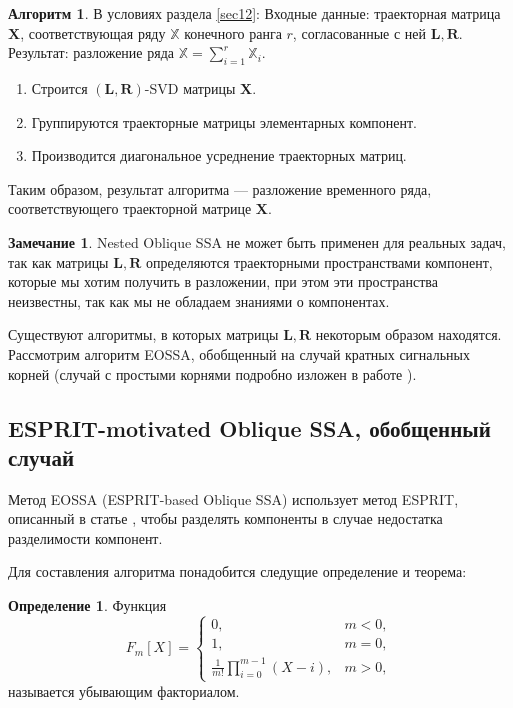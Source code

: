 \documentclass[specialist, substylefile = spbureport.rtx, subf,href,colorlinks=true, 12pt]{disser}
\theoremstyle{definition}
\newtheorem{definition}{Определение}
\newtheorem{algorithm}{Алгоритм}
\newtheorem{remark}{Замечание}
\begin{document}
\begin{algorithm}
    В условиях раздела \ref{sec12}:
    Входные данные: траекторная матрица $\mathbf{X}$, соответствующая ряду $\mathbb{X}$ конечного ранга $r$, согласованные с ней $\mathbf{L}, \mathbf{R}$.\\
    Результат: разложение ряда $\mathbb{X} = \sum_{i = 1}^{r}\mathbb{X}_i$.
\end{algorithm}
    \begin{enumerate}
        \item Строится $(\mathbf{L}, \mathbf{R})$-SVD матрицы $\mathbf{X}$.
        \item Группируются траекторные матрицы элементарных компонент.
        \item Производится диагональное усреднение траекторных матриц.
    \end{enumerate}
    Таким образом, результат алгоритма --- разложение временного ряда, соответствующего траекторной матрице $\mathbf{X}$.
    \begin{remark}
    Nested Oblique SSA не может быть применен для реальных задач, так как матрицы $\mathbf{L}, \mathbf{R}$ определяются траекторными пространствами компонент, которые мы хотим получить в разложении, при этом эти пространства неизвестны, так как мы не обладаем знаниями о компонентах.
    \end{remark}
    Существуют алгоритмы, в которых матрицы $\mathbf{L}, \mathbf{R}$ некоторым образом находятся. Рассмотрим алгоритм EOSSA, обобщенный на случай кратных сигнальных корней (случай с простыми корнями подробно изложен в работе \cite{Shlemov}).
    
\subsection{ESPRIT-motivated Oblique SSA, обобщенный случай}

Метод EOSSA (ESPRIT-based Oblique SSA) использует метод ESPRIT, описанный в статье \cite{Roy89}, чтобы разделять компоненты в случае недостатка разделимости компонент.

Для составления алгоритма понадобится следущие определение и теорема:

\begin{definition}
        Функция
        \begin{equation*}
            F_m[X] = \begin{cases}
            0, & m < 0, \\
            1, & m = 0, \\
            \frac{1}{m!}\prod_{i=0}^{m - 1}(X - i), & m>0,
            \end{cases}
        \end{equation*}
        называется убывающим факториалом.
    \end{definition}
\end{document}
